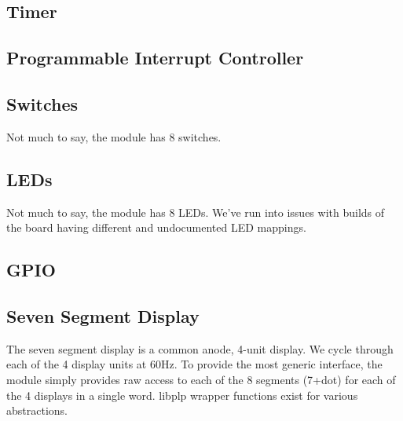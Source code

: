 \documentclass{article}
\begin{document}
\subsection{Timer}

\subsection{Programmable Interrupt Controller}

\subsection{Switches}
Not much to say, the module has 8 switches.

\subsection{LEDs}
Not much to say, the module has 8 LEDs. We've run into issues with builds of the board having different and undocumented LED mappings.

\subsection{GPIO}

\subsection{Seven Segment Display}
The seven segment display is a common anode, 4-unit display. We cycle through each of the 4 display units at 60Hz. To provide the most generic interface, the module simply provides raw access to each of the 8 segments (7+dot) for each of the 4 displays in a single word. libplp wrapper functions exist for various abstractions.
\end{document}
